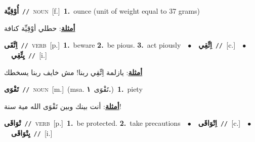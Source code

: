 \documentclass[10pt,a4paper,twoside]{article} %
\begin{document}
\begin{multicols}{2}
{\setlength\topsep{0pt}\textbf{\foreignlanguage{arabic}{أُوْقِيِّة}}\ {\color{gray}\texttt{//}\color{black}}\ \textsc{noun}\ [f.]\ \textbf{1.}~ounce (unit of weight equal to 37 grams)\  \begin{flushright}\color{gray}\foreignlanguage{arabic}{\textbf{\underline{\foreignlanguage{arabic}{أمثلة}}}: حطلي أوْقِيِّة كنافة}\end{flushright}\color{black}} \vspace{2mm}

{\setlength\topsep{0pt}\textbf{\foreignlanguage{arabic}{اِتَّقَى}}\ {\color{gray}\texttt{//}\color{black}}\ \textsc{verb}\ [p.]\ \textbf{1.}~beware  \textbf{2.}~be pious.  \textbf{3.}~act piously\ \ $\bullet$\ \ \setlength\topsep{0pt}\textbf{\foreignlanguage{arabic}{اِتِّقِي}}\ {\color{gray}\texttt{//}\color{black}}\ [c.]\ \ $\bullet$\ \ \setlength\topsep{0pt}\textbf{\foreignlanguage{arabic}{يِتِّقِي}}\ {\color{gray}\texttt{//}\color{black}}\ [i.]\  \begin{flushright}\color{gray}\foreignlanguage{arabic}{\textbf{\underline{\foreignlanguage{arabic}{أمثلة}}}: يازلمة اِتِّقِي ربنا! مش خايف ربنا يسخطك}\end{flushright}\color{black}} \vspace{2mm}

{\setlength\topsep{0pt}\textbf{\foreignlanguage{arabic}{تَقْوَى}}\ {\color{gray}\texttt{//}\color{black}}\ \textsc{noun}\ [m.]\ \color{gray}(msa. \foreignlanguage{arabic}{تَقْوَى}~\foreignlanguage{arabic}{\textbf{١.}})\color{black}\ \textbf{1.}~piety\  \begin{flushright}\color{gray}\foreignlanguage{arabic}{\textbf{\underline{\foreignlanguage{arabic}{أمثلة}}}: أنت بينك وبين تَقْوَى الله مية سنة!}\end{flushright}\color{black}} \vspace{2mm}

{\setlength\topsep{0pt}\textbf{\foreignlanguage{arabic}{تْوَاقَى}}\ {\color{gray}\texttt{//}\color{black}}\ \textsc{verb}\ [p.]\ \textbf{1.}~be protected.  \textbf{2.}~take precautions\ \ $\bullet$\ \ \setlength\topsep{0pt}\textbf{\foreignlanguage{arabic}{اِتْوَاقَى}}\ {\color{gray}\texttt{//}\color{black}}\ [c.]\ \ $\bullet$\ \ \setlength\topsep{0pt}\textbf{\foreignlanguage{arabic}{يِتْوَاقَى}}\ {\color{gray}\texttt{//}\color{black}}\ [i.]\ } \vspace{2mm}


\end{multicols}
\end{document}
